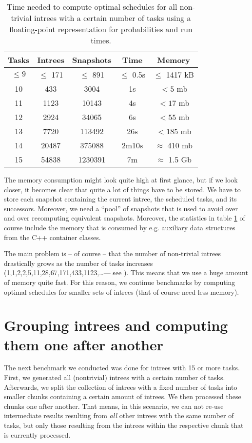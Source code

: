 \begin{table}[ht]
  \centering
  \begin{tabular}[ht]{ccccc}
    Tasks & Intrees & Snapshots & Time & Memory \\
    \hline{}
    $\leq 9$ & $\leq$ 171 & $\leq$ 891 & $\leq$ 0.5s & $\leq$ 1417 kB \\
    10 & 433 & 3004 & 1s & $<5$ mb \\
    11 & 1123 & 10143 & 4s & $<17$ mb \\
    12 & 2924 & 34065 & 6s & $<55$ mb \\
    13 & 7720 & 113492 & 26s & $<185$ mb \\
    14 & 20487 & 375088 & 2m10s & $\approx$ 410 mb \\
    15 & 54838 & 1230391 & 7m & $\approx$ 1.5 Gb \\
    
  \end{tabular}
  \caption{Time needed to compute optimal schedules for all non-trivial intrees with a certain number of tasks using a floating-point representation for probabilities and run times.}
  \label{tab:time-benchmark}
\end{table}

The memory consumption might look quite high at first glance, but if we look closer, it becomes clear that quite a lot of things have to be stored. We have to store each snapshot containing the current intree, the scheduled tasks, and its successors. Moreover, we need a ``pool'' of snapshots that is used to avoid over and over recomputing equivalent snapshots. Moreover, the statistics in table \ref{tab:time-benchmark} of course include the memory that is consumed by e.g. auxiliary data structures from the C++ container classes.

The main problem is -- of course -- that the number of non-trivial intrees drastically grows as the number of tasks increases (1,1,2,2,5,11,28,67,171,433,1123,\dots --- see \cite{oeisnumbernontrivialintrees}). This means that we use a huge amount of memory quite fast. For this reason, we continue benchmarks by computing optimal schedules for smaller sets of intrees (that of course need less memory).

\section{Grouping intrees and computing them one after another}
\label{sec:benchmarks-clustered-intrees}

The next benchmark we conducted was done for intrees with 15 or more tasks. First, we generated all (nontrivial) intrees with a certain number of tasks. Afterwards, we split the collection of intrees with a fixed number of tasks into smaller chunks containing a certain amount of intrees. We then processed these chunks one after another. That means, in this scenario, we can not re-use intermediate results resulting from \emph{all} other intrees with the same number of tasks, but only those resulting from the intrees within the respective chunk that is currently  processed.

